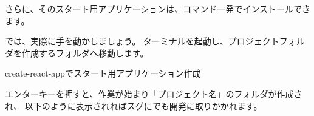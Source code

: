 \vspace*{\baselineskip}

さらに、そのスタート用アプリケーションは、コマンド一発でインストールできます。

\vspace*{\baselineskip}

では、実際に手を動かしましょう。
ターミナルを起動し、プロジェクトフォルダを作成するフォルダへ移動します。

\def\startercodeblockfontsize{}
\begin{starterterminal}[]{create{-}react{-}appでスタート用アプリケーション作成}\end{starterterminal}

エンターキーを押すと、作業が始まり「プロジェクト名」のフォルダが作成され、
以下のように表示されればスグにでも開発に取りかかれます。

